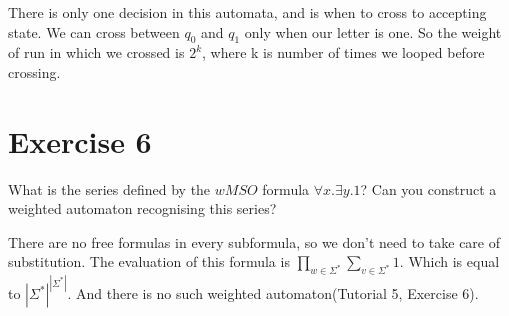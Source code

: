 \documentclass{article}
\begin{document}
\begin{center}
\end{center}
There is only one decision in this automata, and is when to cross to accepting state. We can cross between $q_0$ and $q_1$ only when our letter is one. So the weight of run in which we crossed is $2^k$, where k is number of times we looped before crossing.  


\section{Exercise 6}
What is the series defined by the $wMSO$ formula $\forall x. \exists y. 1$? Can you construct a weighted automaton recognising this series?

There are no free formulas in every subformula, so we don't need to take care of substitution.
The evaluation of this formula is $\prod_{w \in \Sigma^*} \sum_{v \in \Sigma^*} 1$. Which is equal to $|\Sigma^*|^{|\Sigma^*|}$. And there is no such weighted automaton(Tutorial 5, Exercise 6). 
\end{document}
